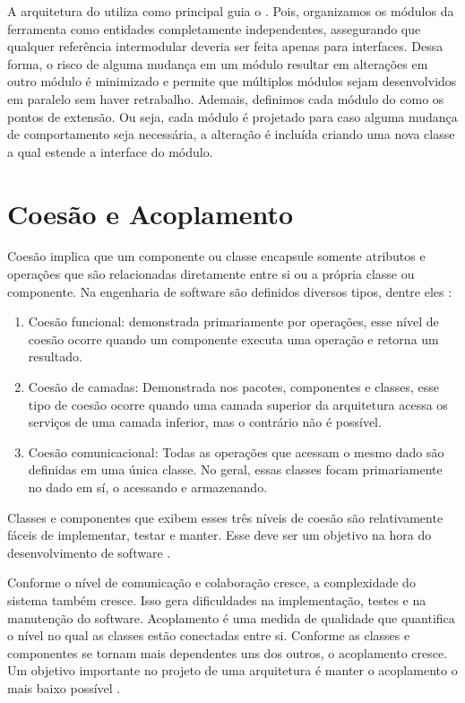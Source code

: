 \documentclass[12pt]{tcc}
\begin{document}
		A arquitetura do  utiliza como principal guia o .
		Pois, organizamos os módulos da ferramenta como entidades completamente independentes, assegurando que qualquer referência intermodular deveria ser feita apenas para interfaces.
		Dessa forma, o risco de alguma mudança em um módulo resultar em alterações em outro módulo é minimizado e permite que múltiplos módulos sejam desenvolvidos em paralelo sem haver retrabalho.
		Ademais, definimos cada módulo do  como os pontos de extensão.
		Ou seja, cada módulo é projetado para caso alguma mudança de comportamento seja necessária, a alteração é incluída criando uma nova classe a qual estende a interface do módulo.

		\section{Coesão e Acoplamento}
		\label{section:coesao-e-acoplamento}

		Coesão implica que um componente ou classe encapsule somente atributos e operações que são relacionadas diretamente entre si ou a própria classe ou componente. Na engenharia de software são definidos diversos tipos, dentre eles \citep{pressman2009software}:

		\begin{enumerate}
			\item Coesão funcional: demonstrada primariamente por operações, esse nível de coesão ocorre quando um componente executa uma operação e retorna um resultado.
			\item Coesão de camadas: Demonstrada nos pacotes, componentes e classes, esse tipo de coesão ocorre quando uma camada superior da arquitetura acessa os serviços de uma camada inferior, mas o contrário não é possível.
			\item Coesão comunicacional: Todas as operações que acessam o mesmo dado são definidas em uma única classe. No geral, essas classes focam primariamente no dado em sí, o acessando e armazenando.
		\end{enumerate}

		Classes e componentes que exibem esses três níveis de coesão são relativamente fáceis de implementar, testar e manter. Esse deve ser um objetivo na hora do desenvolvimento de software \citep{pressman2009software}.
		
		Conforme o nível de comunicação e colaboração cresce, a complexidade do sistema também cresce. Isso gera dificuldades na implementação, testes e na manutenção do software. Acoplamento é uma medida de qualidade que quantifica o nível no qual as classes estão conectadas entre si. Conforme as classes e componentes se tornam mais dependentes uns dos outros, o acoplamento cresce. Um objetivo importante no projeto de uma arquitetura é manter o acoplamento o mais baixo possível \citep{pressman2009software}.
\end{document}
